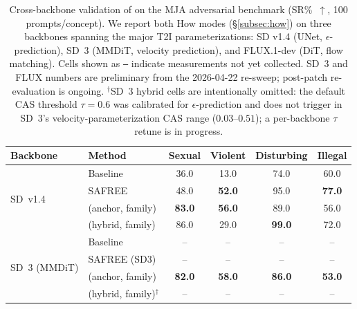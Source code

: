 \begin{table}[!tb]
    \centering
    \renewcommand{\arraystretch}{1.15}
    \setlength{\tabcolsep}{0.45em}
    \caption{Cross-backbone validation of \ours{} on the MJA adversarial benchmark (SR\%~$\uparrow$, 100 prompts/concept). We report both How modes (\S\ref{subsec:how}) on three backbones spanning the major T2I parameterizations: SD v1.4 (UNet, $\epsilon$-prediction), SD~3 (MMDiT, velocity prediction), and FLUX.1-dev (DiT, flow matching). Cells shown as \texttt{--} indicate measurements not yet collected. \ours{} SD~3 and FLUX numbers are preliminary from the 2026-04-22 re-sweep; post-patch re-evaluation is ongoing. $^{\dagger}$SD~3 hybrid cells are intentionally omitted: the default CAS threshold $\tau{=}0.6$ was calibrated for $\epsilon$-prediction and does not trigger in SD~3's velocity-parameterization CAS range ($0.03$--$0.51$); a per-backbone $\tau$ retune is in progress.}
    \label{table:cross_backbone}
    \vspace{2pt}
    \small
    \begin{tabular}{llcccc}
    \toprule
    \textbf{Backbone} & \textbf{Method} & \textbf{Sexual} & \textbf{Violent} & \textbf{Disturbing} & \textbf{Illegal} \\
    \midrule
    \multirow{4}{*}{SD~v1.4}
      & Baseline                  & 36.0 & 13.0 & 74.0 & 60.0 \\
      & SAFREE                    & 48.0 & \textbf{52.0} & 95.0 & \textbf{77.0} \\
      & \cellcolor{blue!8}\ours{} (anchor, family) & \cellcolor{blue!8}\textbf{83.0} & \cellcolor{blue!8}\textbf{56.0} & \cellcolor{blue!8}89.0 & \cellcolor{blue!8}56.0 \\
      & \cellcolor{blue!8}\ours{} (hybrid, family) & \cellcolor{blue!8}86.0 & \cellcolor{blue!8}29.0 & \cellcolor{blue!8}\textbf{99.0} & \cellcolor{blue!8}72.0 \\
    \midrule
    \multirow{4}{*}{SD~3 (MMDiT)}
      & Baseline                  & -- & -- & -- & -- \\
      & SAFREE (SD3)              & -- & -- & -- & -- \\
      & \cellcolor{blue!8}\ours{} (anchor, family) & \cellcolor{blue!8}\textbf{82.0} & \cellcolor{blue!8}\textbf{58.0} & \cellcolor{blue!8}\textbf{86.0} & \cellcolor{blue!8}\textbf{53.0} \\
      & \cellcolor{blue!8}\ours{} (hybrid, family)$^{\dagger}$ & \cellcolor{blue!8}-- & \cellcolor{blue!8}-- & \cellcolor{blue!8}-- & \cellcolor{blue!8}-- \\

\end{tabular}
\end{table}
